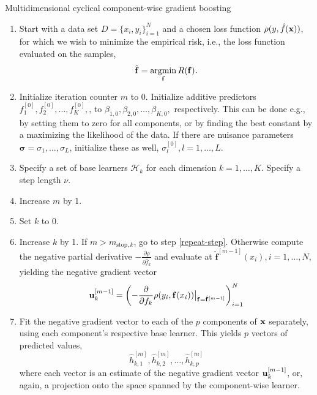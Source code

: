 \begin{algorithm}
\caption{Multidimensional cyclical component-wise gradient boosting}
\label{algo:multi-cyclical}
\begin{enumerate}
    \item Start with a data set $D=\{x_i, y_i\}_{i=1}^N$ and a chosen loss function $\rho(y,\hat{f}(\mathbf{x}))$, for which we wish to
        minimize the empirical risk, i.e., the loss function evaluated on the samples,
        \begin{equation}
            \hat{\mathbf{f}}=\operatorname*{argmin}_{\mathbf{f}}R(\mathbf{f}).
        \end{equation}
    \item Initialize iteration counter $m$ to 0. Initialize additive predictors $f^{[0]}_1,f^{[0]}_2,\ldots,f^{[0]}_K,$, to $\beta_{1,0},\beta_{2,0},\ldots,\beta_{K,0},$ respectively. This can be done e.g., by setting them to zero for all components, or by finding the best constant by a maximizing the likelihood of the data. If there are nuisance parameters $\mathbf{\sigma}=\sigma_1,\ldots,\sigma_L$, initialize these as well, $\sigma_l^{[0]},l=1,\ldots,L$.
    \item\label{initialization} Specify a set of base learners $\mathcal{H}_k$ for each dimension $k=1,\ldots,K$. Specify a step length $\nu$.
    \item Increase $m$ by 1.
    \item Set $k$ to 0.
    \item\label{cyclic-first} Increase $k$ by 1. If $m>m_{\text{stop},k}$, go to step \ref{repeat-step}. Otherwise compute the negative partial derivative
        $-\frac{\partial\rho}{\partial \hat{f}_k}$ and evaluate at $\hat{\mathbf{f}}^{[m-1]}(x_i),i=1,\ldots,N$, yielding the
        negative gradient vector
        \begin{equation}
            \mathbf{u}^{[m-1]}_k=\left(-\frac{\partial}{\partial f_k}\rho(y_i, \mathbf{f}(x_i))\big\rvert_{\mathbf{f}=\hat{\mathbf{f}}^{[m-1]}}\right)_{i=1}^N
        \end{equation}
    \item Fit the negative gradient vector to each of the $p$ components of $\mathbf{x}$ separately, using each component's respective base learner. This yields $p$ vectors of predicted values,
        \begin{equation}
            \hat{h}_{k,1}^{[m]},\hat{h}_{k,2}^{[m]},\ldots,\hat{h}_{k,p}^{[m]}
        \end{equation}
        where each vector is an estimate of the negative gradient vector $\mathbf{u}^{[m-1]}_k$, or, again, a projection onto the space spanned by the component-wise learner.

\end{enumerate}
\end{algorithm}
